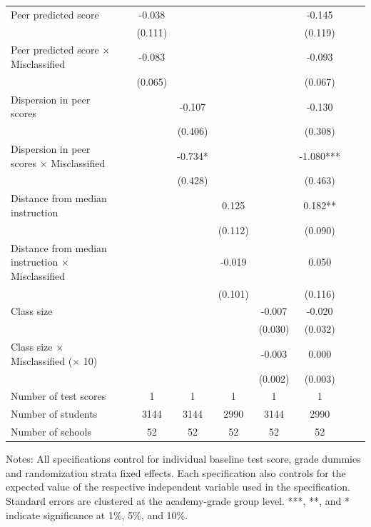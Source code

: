 \begin{center}
\begin{scriptsize}
\begin{threeparttable}
\begin{tabular} {@{} l l c c c c c c c  @{}}
\\
Peer predicted score &  & -0.038 &  &  &  & -0.145 \\
                 &  & (0.111) &  &  &  & (0.119) \\
Peer predicted score $\times$ Misclassified &  & -0.083 &  &  &  & -0.093 \\
                 &  & (0.065) &  &  &  & (0.067) \\
Dispersion in peer scores &  &  & -0.107 &  &  & -0.130 \\
                 &  &  & (0.406) &  &  & (0.308) \\
Dispersion in peer scores $\times$ Misclassified &  &  & -0.734* &  &  & -1.080*** \\
                 &  &  & (0.428) &  &  & (0.463) \\
Distance from median instruction &  &  &  & 0.125 &  & 0.182** \\
                 &  &  &  & (0.112) &  & (0.090) \\
Distance from median instruction $\times$ Misclassified &  &  &  & -0.019 &  & 0.050 \\
                 &  &  &  & (0.101) &  & (0.116) \\
Class size &  &  &  &  & -0.007 & -0.020 \\
                 &  &  &  &  & (0.030) & (0.032) \\
Class size $\times$ Misclassified ($\times$ 10) &  &  &  &  & -0.003 & 0.000 \\
                 &  &  &  &  & (0.002) & (0.003) \\
\midrule
Number of test scores &  & 1 & 1 & 1 & 1 & 1 \\
Number of students &  & 3144 & 3144 & 2990 & 3144 & 2990 \\
Number of schools &  & 52 & 52 & 52 & 52 & 52 \\
\bottomrule
\end{tabular}
\begin{tablenotes}
\item Notes: All specifications control for individual baseline test score, grade dummies and randomization strata fixed effects. Each specification also controls for the expected value of the respective independent variable used in the specification. Standard errors are clustered at the academy-grade group level. ***, **, and * indicate significance at 1\%, 5\%, and 10\%.\end{tablenotes}
\end{threeparttable}
\end{scriptsize}
\end{center}
\clearpage
